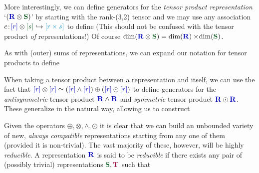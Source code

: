 \documentclass[12pt,a4paper]{article}\let\ifpdf\relax
\begin{document}
More interestingly, we can define generators for the \emph{tensor product representation} \mbox{`$(\mathbf{\b{R}}\otimes\mathbf{\g{S}})$'} by starting with the rank-(3,2) tensor
%
%
and we may use any association $c\!:\!\b{[r]}\otimes\g{[s]}\hookrightarrow\t{[r\times s]}$ to define 
%
%
(This should not be confused with the tensor product \emph{of} representations!) Of course $\mathrm{dim}(\mathbf{\b{R}}\otimes\mathbf{\g{S}})=\mathrm{dim}(\mathbf{\b{R}})\times\!\mathrm{dim}(\mathbf{\g{S}})$.

As with (outer) sums of representations, we can expand our notation for tensor products to define
%
%

When taking a tensor product between a representation and itself, we can use the fact that $\b{[r]}\otimes\b{[r]}\simeq(\b{[r]}\wedge\b{[r]})\oplus(\b{[r]}\odot\b{[r]})$ to define generators for the \emph{antisymmetric} tensor product $\mathbf{\b{R}}\wedge\mathbf{\b{R}}$ and \emph{symmetric} tensor product $\mathbf{\b{R}}\odot\mathbf{\b{R}}$. These generalize in the natural way, allowing us to construct
%
%

Given the operators $\oplus,\otimes,\wedge,\odot$ it is clear that we can build an unbounded variety of new, \emph{always compatible} representations starting from any one of them (provided it is non-trivial). The vast majority of these, however, will be highly \emph{reducible}. A representation $\mathbf{\b{R}}$ is said to be \emph{reducible} if there exists any pair of (possibly trivial) representations $\mathbf{\g{S}},\mathbf{\r{T}}$ such that
%
%
\end{document}
